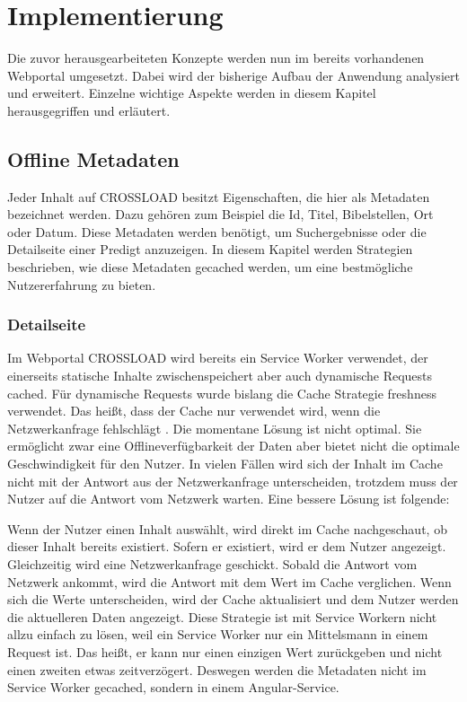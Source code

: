 \chapter{Implementierung}
\label{Kap5}
Die zuvor herausgearbeiteten Konzepte werden nun im bereits vorhandenen Webportal umgesetzt. Dabei wird der bisherige Aufbau der Anwendung analysiert und erweitert. Einzelne wichtige Aspekte werden in diesem Kapitel herausgegriffen und erläutert.

\section{Offline Metadaten}
Jeder Inhalt auf CROSSLOAD besitzt Eigenschaften, die hier als Metadaten bezeichnet werden. Dazu gehören zum Beispiel die Id, Titel, Bibelstellen, Ort oder Datum. Diese Metadaten werden benötigt, um Suchergebnisse oder die Detailseite einer Predigt anzuzeigen. In diesem Kapitel werden Strategien beschrieben, wie diese Metadaten gecached werden, um eine bestmögliche Nutzererfahrung zu bieten.

\subsection{Detailseite}
Im Webportal CROSSLOAD wird bereits ein Service Worker verwendet, der einerseits statische Inhalte zwischenspeichert aber auch dynamische Requests cached. Für dynamische Requests wurde bislang die Cache Strategie freshness verwendet. Das heißt, dass der Cache nur verwendet wird, wenn die Netzwerkanfrage fehlschlägt \autocite{angular-service-worker}. Die momentane Lösung ist nicht optimal. Sie ermöglicht zwar eine Offlineverfügbarkeit der Daten aber bietet nicht die optimale Geschwindigkeit für den Nutzer. In vielen Fällen wird sich der Inhalt im Cache nicht mit der Antwort aus der Netzwerkanfrage unterscheiden, trotzdem muss der Nutzer auf die Antwort vom Netzwerk warten. Eine bessere Lösung ist folgende:

Wenn der Nutzer einen Inhalt auswählt, wird direkt im Cache nachgeschaut, ob dieser Inhalt bereits existiert. Sofern er existiert, wird er dem Nutzer angezeigt. Gleichzeitig wird eine Netzwerkanfrage geschickt. Sobald die Antwort vom Netzwerk ankommt, wird die Antwort mit dem Wert im Cache verglichen. Wenn sich die Werte unterscheiden, wird der Cache aktualisiert und dem Nutzer werden die aktuelleren Daten angezeigt. Diese Strategie ist mit Service Workern nicht allzu einfach zu lösen, weil ein Service Worker nur ein Mittelsmann in einem Request ist. Das heißt, er kann nur einen einzigen Wert zurückgeben und nicht einen zweiten etwas zeitverzögert. Deswegen werden die Metadaten nicht im Service Worker gecached, sondern in einem Angular-Service.

